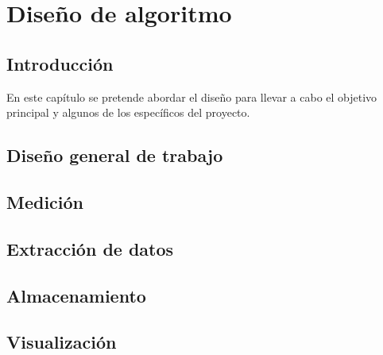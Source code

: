 \chapter{Diseño de algoritmo}
\section{Introducción}
En este capítulo se pretende abordar el diseño para llevar a cabo el objetivo principal y algunos de los específicos del proyecto.

\section{Diseño general de trabajo}


\section{Medición}

\section{Extracción de datos}
\section{Almacenamiento}
\section{Visualización}